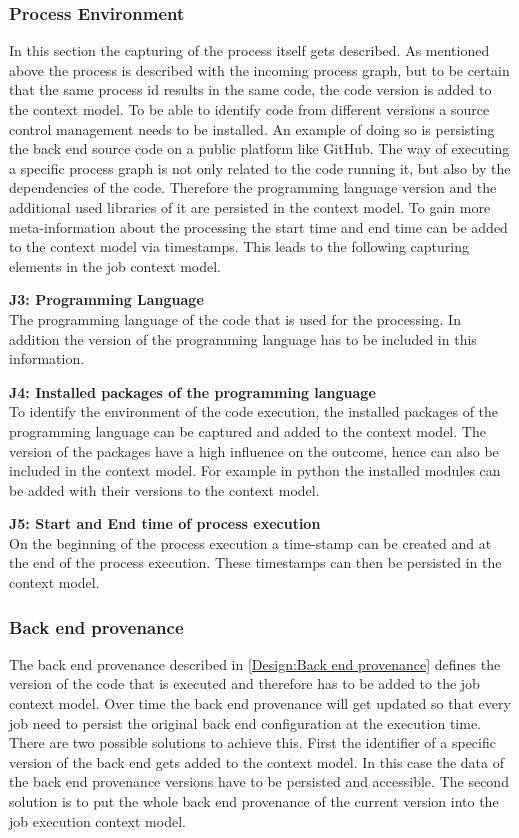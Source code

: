 \documentclass[draft,final]{vutinfth} %
\begin{document}
\subsubsection{Process Environment}\label{Job:Process Data}
In this section the capturing of the process itself gets described. As mentioned above the process is described with the incoming process graph, but to be certain that the same process id results in the same code, the code version is added to the context model. To be able to identify code from different versions a source control management needs to be installed. An example of doing so is persisting the back end source code on a public platform like GitHub. 
The way of executing a specific process graph is not only related to the code running it, but also by the dependencies of the code. Therefore the programming language version and the additional used libraries of it are persisted in the context model.  To gain more meta-information about the processing the start time and end time can be added to the context model via timestamps. This leads to the following capturing elements in the job context model.

\textbf{J3: Programming Language}\\
The programming language of the code that is used for the processing. In addition the version of the programming language has to be included in this information.

\textbf{J4: Installed packages of the programming language}\\
To identify the environment of the code execution, the installed packages of the programming language can be captured and added to the context model. The version of the packages have a high influence on the outcome, hence can also be included in the context model. For example in python the installed modules can be added with their versions to the context model.

\textbf{J5: Start and End time of process execution}\\
On the beginning of the process execution a time-stamp can be created and at the end of the process execution. These timestamps can then be persisted in the context model.

\subsubsection{Back end provenance}\label{Job:Back end provenance}
The back end provenance described in \ref{Design:Back end provenance} defines the version of the code that is executed and therefore has to be added to the job context model. Over time the back end provenance will get updated so that every job need to persist the original back end configuration at the execution time. There are two possible solutions to achieve this. First the identifier of a specific version of the back end gets added to the context model. In this case the data of the back end provenance versions have to be persisted and accessible. The second solution is to put the whole back end provenance of the current version into the job execution context model.
\end{document}
